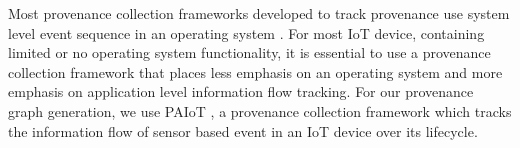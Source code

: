 

Most provenance collection frameworks developed to track provenance use system level event sequence in an operating system \cite{pasquier-socc2017,acsac,Muniswamy-Reddy}. For most IoT device, containing limited or no operating system functionality, it is essential to use a provenance collection framework that places less emphasis on an operating system and more emphasis on application level information flow tracking. For our provenance graph generation, we use PAIoT \cite{paiot}, a provenance collection framework which tracks the information flow of sensor based event in an IoT device over its lifecycle. 


%




